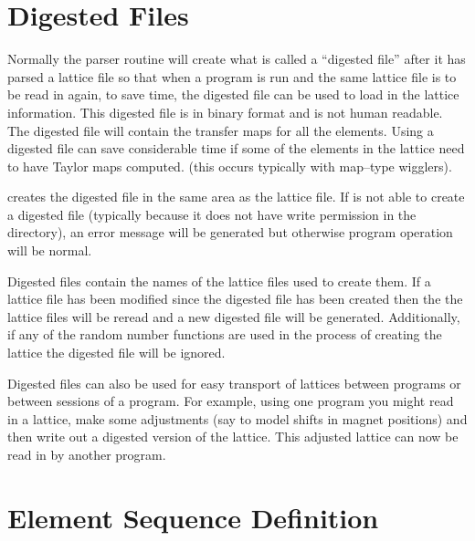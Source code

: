 \section{Digested Files}
\label{s:lattice_files}

Normally the \bmad parser routine will create what is called a
``digested file'' after it has parsed a lattice file so that when a
program is run and the same lattice file is to be read in again, to save
time, the digested file can be used to load in the lattice information.
This digested file is in binary format and is not human readable. The
digested file will contain the transfer maps for all the elements. 
Using a digested file can save considerable time if some of the
elements in the lattice need to have Taylor maps computed.
(this occurs typically with map--type wigglers).

\bmad creates the digested file in the same area as the lattice file.
If \bmad is not able to create a digested file (typically because it
does not have write permission in the directory), an error message will
be generated but otherwise program operation will be normal.

Digested files contain the names of the lattice files used to create
them. If a lattice file has been modified since the digested file has
been created then the the lattice files will be reread and a new
digested file will be generated. Additionally, if any of the random
number functions are used in the process of creating the lattice the
digested file will be ignored.

Digested files can also be used for easy transport of lattices between
programs or between sessions of a program. For example, using one
program you might read in a lattice, make some adjustments (say to model
shifts in magnet positions) and then write out a digested version of the
lattice. This adjusted lattice can now be read in by another program.

\section{Element Sequence Definition}

